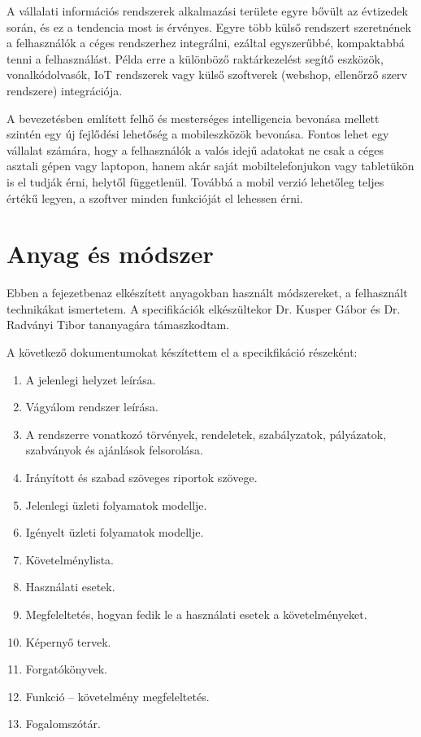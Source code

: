\documentclass[12pt]{article}
\begin{document}
A vállalati információs rendszerek alkalmazási területe egyre bővült az évtizedek során, és ez a tendencia most is érvényes. Egyre több külső rendszert szeretnének a felhasználók a céges rendszerhez integrálni, ezáltal egyszerűbbé, kompaktabbá tenni a felhasználást. Példa erre a különböző raktárkezelést segítő eszközök, vonalkódolvasók, IoT rendszerek vagy külső szoftverek (webshop, ellenőrző szerv rendszere) integrációja.

A bevezetésben említett felhő és mesterséges intelligencia bevonása mellett szintén egy új fejlődési lehetőség a mobileszközök bevonása. Fontos lehet egy vállalat számára, hogy a felhasználók a valós idejű adatokat ne csak a céges asztali gépen vagy laptopon, hanem akár saját mobiltelefonjukon vagy tabletükön is el tudják érni, helytől függetlenül. Továbbá a mobil verzió lehetőleg teljes értékű legyen, a szoftver minden funkcióját el lehessen érni.


\newpage
\section{Anyag és módszer}

Ebben a fejezetbenaz elkészített anyagokban használt módszereket, a felhasznált technikákat ismertetem. A specifikációk elkészültekor Dr. Kusper Gábor és Dr. Radványi Tibor tananyagára támaszkodtam.

A következő dokumentumokat készítettem el a specikfikáció részeként:

\begin{enumerate}
\item A jelenlegi helyzet leírása.
\item Vágyálom rendszer leírása.
\item A rendszerre vonatkozó  törvények, rendeletek, szabályzatok, pályázatok, szabványok és ajánlások felsorolása.
\item Irányított és szabad szöveges riportok szövege.
\item Jelenlegi üzleti folyamatok modellje.
\item Igényelt üzleti folyamatok modellje.
\item Követelménylista.
\item Használati esetek.
\item Megfeleltetés, hogyan fedik le a használati esetek a követelményeket.
\item Képernyő tervek.
\item Forgatókönyvek.
\item Funkció – követelmény megfeleltetés.
\item Fogalomszótár.
\end{enumerate}
\end{document}
